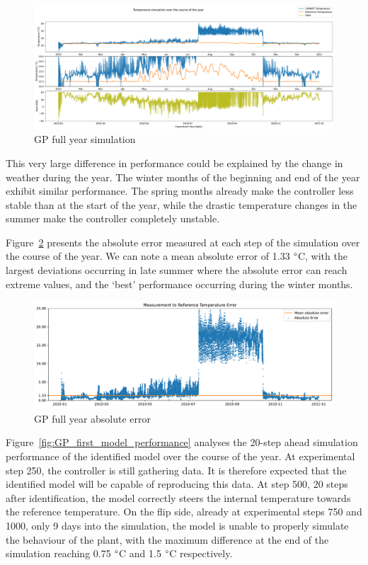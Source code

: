 \begin{figure}[ht]
    \centering
    \includegraphics[width =
    \textwidth]{Plots/4_GP_480pts_12_averageYear_fullyear.pdf}
    \caption{GP full year simulation}
    \label{fig:GP_fullyear_simulation}
\end{figure}

This very large difference in performance could be explained by the change in
weather during the year. The winter months of the beginning and end of the year
exhibit similar performance. The spring months already make the controller less
stable than at the start of the year, while the drastic temperature changes in
the summer make the controller completely unstable.

\clearpage


Figure~\ref{fig:GP_fullyear_abserr} presents the absolute error measured at each
step of the simulation over the course of the year. We can note a mean absolute
error of 1.33 $\degree$C, with the largest deviations occurring in late summer
where the absolute error can reach extreme values, and the `best' performance
occurring during the winter months. 

\begin{figure}[ht]
    \centering
    \includegraphics[width =
    \textwidth]{Plots/4_GP_480pts_12_averageYear_abserr.pdf}
    \caption{GP full year absolute error}
    \label{fig:GP_fullyear_abserr}
\end{figure}

Figure~\ref{fig:GP_first_model_performance} analyses the 20-step ahead
simulation performance of the identified model over the course of the year. At
experimental step 250, the controller is still gathering data. It is therefore
expected that the identified model will be capable of reproducing this data. At
step 500, 20 steps after identification, the model correctly steers the internal
temperature towards the reference temperature. On the flip side, already at
experimental steps 750 and 1000, only 9 days into the simulation, the model is
unable to properly simulate the behaviour of the plant, with the maximum
difference at the end of the simulation reaching 0.75 $\degree$C and 1.5
$\degree$C respectively.

